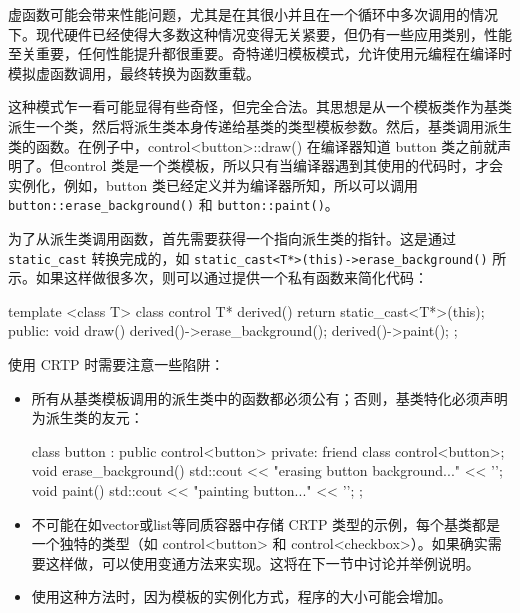 
虚函数可能会带来性能问题，尤其是在其很小并且在一个循环中多次调用的情况下。现代硬件已经使得大多数这种情况变得无关紧要，但仍有一些应用类别，性能至关重要，任何性能提升都很重要。奇特递归模板模式，允许使用元编程在编译时模拟虚函数调用，最终转换为函数重载。

这种模式乍一看可能显得有些奇怪，但完全合法。其思想是从一个模板类作为基类派生一个类，然后将派生类本身传递给基类的类型模板参数。然后，基类调用派生类的函数。在例子中，control<button>::draw() 在编译器知道 button 类之前就声明了。但control 类是一个类模板，所以只有当编译器遇到其使用的代码时，才会实例化，例如，button 类已经定义并为编译器所知，所以可以调用 \verb|button::erase_background()| 和 \verb|button::paint()|。

为了从派生类调用函数，首先需要获得一个指向派生类的指针。这是通过 \verb|static_cast| 转换完成的，如 \verb|static_cast<T*>(this)->erase_background()| 所示。如果这样做很多次，则可以通过提供一个私有函数来简化代码：

\begin{cpp}
template <class T>
class control
{
    T* derived() { return static_cast<T*>(this); }
    public:
    void draw()
    {
        derived()->erase_background();
        derived()->paint();
    }
};
\end{cpp}

使用 CRTP 时需要注意一些陷阱：

\begin{itemize}
\item
所有从基类模板调用的派生类中的函数都必须公有；否则，基类特化必须声明为派生类的友元：

\begin{cpp}
class button : public control<button>
{
    private:
    friend class control<button>;
    void erase_background()
    {
        std::cout << "erasing button background..." << '\n';
    }
    void paint()
    {
        std::cout << "painting button..." << '\n';
    }
};
\end{cpp}

\item
不可能在如vector或list等同质容器中存储 CRTP 类型的示例，每个基类都是一个独特的类型（如 control<button> 和 control<checkbox>）。如果确实需要这样做，可以使用变通方法来实现。这将在下一节中讨论并举例说明。

\item
使用这种方法时，因为模板的实例化方式，程序的大小可能会增加。
\end{itemize}

